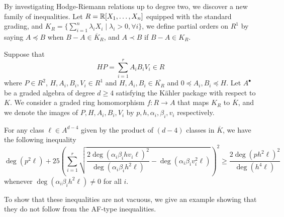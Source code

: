 By investigating Hodge-Riemann relations up to degree two, we discover a new family of inequalities. Let $R=\mathbb{R}[X_1,\ldots,X_n]$ equipped with the standard grading, and $K_R=\{\sum_{i=1}^n \lambda_iX_i\mid \lambda_i>0,\forall i\}$, we define partial orders on $R^1$ by saying $A\preceq B$ when $B-A\in \overline K_R$, and $A\prec B$ if $B-A\in K_R$. 
\begin{theorem}\label{thm: main}
Suppose that
\[
    HP=\sum_{i=1}^rA_iB_iV_i\in R\tag{1}\label{eq: referencing}
\]
where $P\in R^2$, $H, A_i,B_i,V_i\in R^1$ and $H,A_i,B_i\in \overline{K_R}$ and $0\preceq A_i,B_i\preceq H$. Let $A^\bullet$ be a graded algebra of degree $d\geq 4$ satisfying the K\"ahler package with respect to $K$. We consider a graded ring homomorphism $f\colon R\to A$ that maps $K_R$ to $\overline K$, and we denote the images of $P,H,A_i,B_i,V_i$ by $p,h,\alpha_i,\beta_i, v_i$ respectively.

For any class $\ell\in A^{d-4}$ given by the product of $(d-4)$ classes in $\overline{K}$, we have the following inequality
\[
\deg (p^2\ell)+25\left(\sum_{i=1}^r \sqrt{\frac{2\deg(\alpha_i\beta_i h v_i\ell)^2}{\deg(\alpha_i\beta_ih^2\ell)}-\deg(\alpha_i\beta_i v_i^2\ell)}\right)^2\geq \frac{2\deg(ph^2\ell)^2}{\deg(h^4\ell)}
\]
whenever $\deg(\alpha_i\beta_ih^2\ell)\neq 0$ for all $i$.
\end{theorem}

To show that these inequalities are not vacuous, we give an example showing that they do not follow from the AF-type inequalities.

